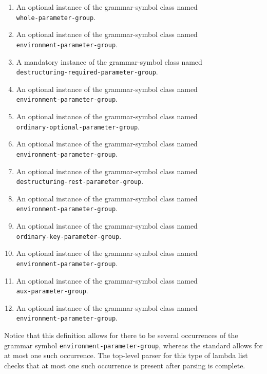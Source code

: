 \begin{enumerate}
\item An optional instance of the grammar-symbol class named\\
  \texttt{whole-parameter-group}.
\item An optional instance of the grammar-symbol class named\\
  \texttt{environment-parameter-group}.
\item A mandatory instance of the grammar-symbol class named\\
  \texttt{destructuring-required-parameter-group}.
\item An optional instance of the grammar-symbol class named\\
  \texttt{environment-parameter-group}.
\item An optional instance of the grammar-symbol class named\\
  \texttt{ordinary-optional-parameter-group}.
\item An optional instance of the grammar-symbol class named\\
  \texttt{environment-parameter-group}.
\item An optional instance of the grammar-symbol class named\\
\texttt{destructuring-rest-parameter-group}.
\item An optional instance of the grammar-symbol class named\\
  \texttt{environment-parameter-group}.
\item An optional instance of the grammar-symbol class named\\
\texttt{ordinary-key-parameter-group}.
\item An optional instance of the grammar-symbol class named\\
  \texttt{environment-parameter-group}.
\item An optional instance of the grammar-symbol class named\\
\texttt{aux-parameter-group}.
\item An optional instance of the grammar-symbol class named\\
  \texttt{environment-parameter-group}.
\end{enumerate}

Notice that this definition allows for there to be several occurrences
of the grammar symbol \texttt{environment-parameter-group}, whereas
the \commonlisp{} standard allows for at most one such occurrence.
The top-level parser for this type of lambda list checks that at most
one such occurrence is present after parsing is complete.

